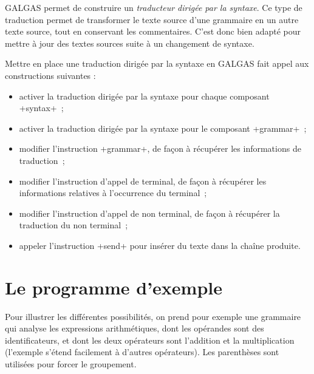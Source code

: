 



GALGAS permet de construire un \emph{traducteur dirigée par la syntaxe}. Ce type de traduction permet de transformer le texte source d'une grammaire en un autre texte source, tout en conservant les commentaires. C'est donc bien adapté pour mettre à jour des textes sources suite à un changement de syntaxe.

Mettre en place une traduction dirigée par la syntaxe en GALGAS fait appel aux constructions suivantes :
\begin{itemize}
  \item activer la traduction dirigée par la syntaxe pour chaque composant \ggsq+syntax+~;
  \item activer la traduction dirigée par la syntaxe pour le composant \ggsq+grammar+~;
  \item modifier l'instruction \ggsq+grammar+, de façon à récupérer les informations de traduction~;
  \item modifier l'instruction d'appel de terminal, de façon à récupérer les informations relatives à l'occurrence du terminal~;
  \item modifier l'instruction d'appel de non terminal, de façon à récupérer la traduction du non terminal~;
  \item appeler l'instruction \ggsq+send+ pour insérer du texte dans la chaîne produite.
\end{itemize}








\section{Le programme d'exemple}

Pour illustrer les différentes possibilités, on prend pour exemple une grammaire qui analyse les expressions arithmétiques, dont les opérandes sont des identificateurs, et dont les deux opérateurs sont l'addition et la multiplication (l'exemple s'étend facilement à d'autres opérateurs). Les parenthèses sont utilisées pour forcer le groupement.


